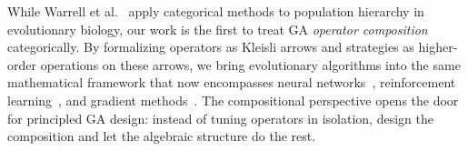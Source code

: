 \documentclass[sigconf,anonymous]{acmart}
\begin{document}
While Warrell et al.~\cite{warrell2024kantorovich} apply categorical methods to population hierarchy in evolutionary biology, our work is the first to treat GA \emph{operator composition} categorically. By formalizing operators as Kleisli arrows and strategies as higher-order operations on these arrows, we bring evolutionary algorithms into the same mathematical framework that now encompasses neural networks~\cite{gavranovic2024categorical}, reinforcement learning~\cite{bakirtzis2024compositional, hedges2024reinforcement}, and gradient methods~\cite{hanks2024gradient}. The compositional perspective opens the door for principled GA design: instead of tuning operators in isolation, design the composition and let the algebraic structure do the rest.



\end{document}
